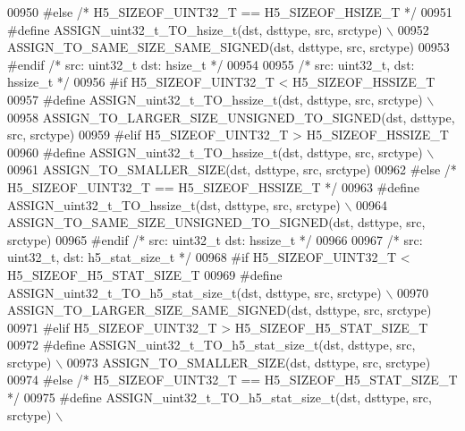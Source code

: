 \begin{DoxyCode}
00950 \textcolor{preprocessor}{#else }\textcolor{comment}{/* H5\_SIZEOF\_UINT32\_T == H5\_SIZEOF\_HSIZE\_T */}\textcolor{preprocessor}{}
00951 \textcolor{preprocessor}{    #define ASSIGN\_uint32\_t\_TO\_hsize\_t(dst, dsttype, src, srctype) \(\backslash\)}
00952 \textcolor{preprocessor}{        ASSIGN\_TO\_SAME\_SIZE\_SAME\_SIGNED(dst, dsttype, src, srctype)}
00953 \textcolor{preprocessor}{#endif }\textcolor{comment}{/* src: uint32\_t dst: hsize\_t */}\textcolor{preprocessor}{}
00954 
00955 \textcolor{comment}{/* src: uint32\_t, dst: hssize\_t */}
00956 \textcolor{preprocessor}{#if H5\_SIZEOF\_UINT32\_T < H5\_SIZEOF\_HSSIZE\_T}
00957 \textcolor{preprocessor}{    #define ASSIGN\_uint32\_t\_TO\_hssize\_t(dst, dsttype, src, srctype) \(\backslash\)}
00958 \textcolor{preprocessor}{        ASSIGN\_TO\_LARGER\_SIZE\_UNSIGNED\_TO\_SIGNED(dst, dsttype, src, srctype)}
00959 \textcolor{preprocessor}{#elif H5\_SIZEOF\_UINT32\_T > H5\_SIZEOF\_HSSIZE\_T}
00960 \textcolor{preprocessor}{    #define ASSIGN\_uint32\_t\_TO\_hssize\_t(dst, dsttype, src, srctype) \(\backslash\)}
00961 \textcolor{preprocessor}{        ASSIGN\_TO\_SMALLER\_SIZE(dst, dsttype, src, srctype)}
00962 \textcolor{preprocessor}{#else }\textcolor{comment}{/* H5\_SIZEOF\_UINT32\_T == H5\_SIZEOF\_HSSIZE\_T */}\textcolor{preprocessor}{}
00963 \textcolor{preprocessor}{    #define ASSIGN\_uint32\_t\_TO\_hssize\_t(dst, dsttype, src, srctype) \(\backslash\)}
00964 \textcolor{preprocessor}{        ASSIGN\_TO\_SAME\_SIZE\_UNSIGNED\_TO\_SIGNED(dst, dsttype, src, srctype)}
00965 \textcolor{preprocessor}{#endif }\textcolor{comment}{/* src: uint32\_t dst: hssize\_t */}\textcolor{preprocessor}{}
00966 
00967 \textcolor{comment}{/* src: uint32\_t, dst: h5\_stat\_size\_t */}
00968 \textcolor{preprocessor}{#if H5\_SIZEOF\_UINT32\_T < H5\_SIZEOF\_H5\_STAT\_SIZE\_T}
00969 \textcolor{preprocessor}{    #define ASSIGN\_uint32\_t\_TO\_h5\_stat\_size\_t(dst, dsttype, src, srctype) \(\backslash\)}
00970 \textcolor{preprocessor}{        ASSIGN\_TO\_LARGER\_SIZE\_SAME\_SIGNED(dst, dsttype, src, srctype)}
00971 \textcolor{preprocessor}{#elif H5\_SIZEOF\_UINT32\_T > H5\_SIZEOF\_H5\_STAT\_SIZE\_T}
00972 \textcolor{preprocessor}{    #define ASSIGN\_uint32\_t\_TO\_h5\_stat\_size\_t(dst, dsttype, src, srctype) \(\backslash\)}
00973 \textcolor{preprocessor}{        ASSIGN\_TO\_SMALLER\_SIZE(dst, dsttype, src, srctype)}
00974 \textcolor{preprocessor}{#else }\textcolor{comment}{/* H5\_SIZEOF\_UINT32\_T == H5\_SIZEOF\_H5\_STAT\_SIZE\_T */}\textcolor{preprocessor}{}
00975 \textcolor{preprocessor}{    #define ASSIGN\_uint32\_t\_TO\_h5\_stat\_size\_t(dst, dsttype, src, srctype) \(\backslash\)}

\end{DoxyCode}
